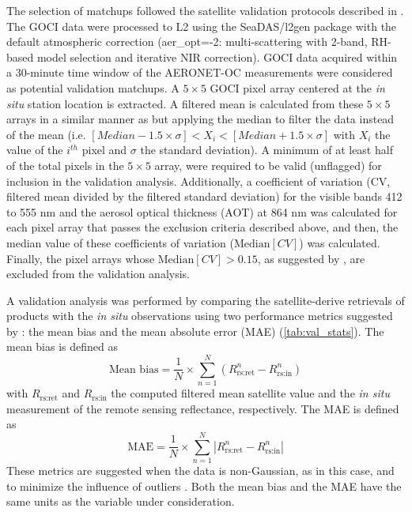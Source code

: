 \documentclass[]{interact}
\theoremstyle{plain}%
\theoremstyle{definition}
\theoremstyle{remark}
\begin{document}
The selection of matchups followed the satellite validation protocols described in \cite{Bailey2006}. Th{}e GOCI data were processed to L2 using the SeaDAS/l2gen package with the default atmospheric correction (aer\_opt=-2: multi-scattering with 2-band, RH-based model selection and iterative NIR correction). GOCI data acquired within a 30-minute time window of the AERONET-OC measurements were considered as potential validation matchups. A $5\times5$ GOCI pixel array centered at the {\it in situ} station location is extracted. A filtered mean is calculated from these $5\times5$ arrays in a similar manner as \cite{Bailey2006} but applying the median to filter the data instead of the mean (i.e. $[Median-1.5\times\sigma] <  X_i < [Median+1.5\times\sigma]$ with $X_i$ the value of the $i^{th}$ pixel and $\sigma$ the standard deviation). A minimum of at least half of the total pixels in the $5\times5$ array, were required to be valid (unflagged) for inclusion in the validation analysis. Additionally, a coefficient of variation (CV, filtered mean divided by the filtered standard deviation) for the visible bands 412 to 555 nm and the aerosol optical thickness (AOT) at 864 nm was calculated for each pixel array that passes the exclusion criteria described above, and then, the median value of these coefficients of variation ($\text{Median}[CV]$) was calculated. Finally, the pixel arrays whose $\text{Median}[CV]>0.15$, as suggested by \cite{Bailey2006}, are excluded from the validation analysis.

A validation analysis was performed by comparing the satellite-derive retrievals of products with the {\it in situ} observations using two performance metrics suggested by \cite{Seegers:18}: the mean bias and the mean absolute error (MAE) (\autoref{tab:val_stats}). The mean bias is defined as 
\begin{equation}
    \text{Mean bias} = \frac{1}{N}\times\sum_{n=1}^N(R_\text{rs:ret}^n-R_\text{rs:in}^n)
\end{equation}
with $R_\text{rs:ret}$ and $R_\text{rs:in}$ the computed filtered mean satellite value and the {\it in situ} measurement of the remote sensing reflectance, respectively. The MAE is defined as 
\begin{equation}
    \text{MAE} = \frac{1}{N}\times\sum_{n=1}^N\left|R_\text{rs:ret}^n-R_\text{rs:in}^n\right|
\end{equation}
These metrics are suggested when the data is non-Gaussian, as in this case, and to minimize the influence of outliers \citep{Seegers:18}. Both the mean bias and the MAE have the same units as the variable under consideration. 
\end{document}
